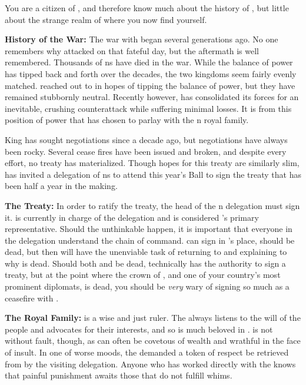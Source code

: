\documentclass[blue]{NeptuneBall}
\begin{document}
\name{\bPacifican{}}

You are a citizen of \pPacifica{}, and therefore know much about the history of \pPacifica{}, but little about the strange realm of \pAtlantis{} where you now find yourself.

{\bf History of the War:}
The war with \pAtlantis{} began several generations ago. No one remembers why \pAtlantis{} attacked on that fateful day, but the aftermath is well remembered. Thousands of \pPacifica{}ns have died in the war. While the balance of power has tipped back and forth over the decades, the two kingdoms seem fairly evenly matched. \pPacifica{} reached out to \pIndia{} in hopes of tipping the balance of power, but they have remained stubbornly neutral. Recently however, \pPacifica{} has consolidated its forces for an inevitable, crushing counterattack while suffering minimal losses. It is from this position of power that \cPacificanRuler{\King} \cPacificanRuler{} has chosen to parlay with the \pAtlantis{}n royal family.

King \cKing{\MYname{}} has sought negotiations since a decade ago, but negotiations have always been rocky. Several cease fires have been issued and broken, and despite every effort, no treaty has materialized. Though hopes for this treaty are similarly slim, \cKing{\King} \cKing{} has invited a delegation of \pPacifica{}ns to attend this year's \cExExKing{} Ball to sign the treaty that has been half a year in the making.

{\bf The Treaty:}
In order to ratify the treaty, the head of the \pPacifica{}n delegation must sign it. \cPrince{} is currently in charge of the delegation and is considered \pPacifica{}'s primary representative. Should the unthinkable happen, it is important that everyone in the delegation understand the chain of command. \cDiplomat{} can sign in \cPrince{}'s place, should \cPrince{} be dead, but then \cDiplomat{} will have the unenviable task of returning to \pPacifica{} and explaining to \cPacificanRuler{\King} \cPacificanRuler{} why \cPacificanRuler{\their} \cPrince{\offspring} is dead. Should both \cPrince{} and \cDiplomat{} be dead, technically \cSpy{} has the authority to sign a treaty, but at the point where the crown  of \pPacifica{}, and one of your country's most prominent diplomats, is dead, you should be \emph{very} wary of signing so much as a ceasefire with \pAtlantis{}.

{\bf The Royal Family:}
\cPacificanRuler{\King} \cPacificanRuler{} is a wise and just ruler. The \cPacificanRuler{\King} always listens to the will of the people and advocates for their interests, and so is much beloved in \pPacifica{}. \cPacificanRuler{\They} is not without fault, though, as \cPacificanRuler{\they} can often be covetous of wealth and wrathful in the face of insult. In one of \cPacificanRuler{\their} worse moods, the \cPacificanRuler{\King} demanded a token of respect be retrieved from \pAtlantis{} by the visiting delegation. Anyone who has worked directly with the \cPacificanRuler{\King} knows that painful punishment awaits those that do not fulfill \cPacificanRuler{\their} whims.
\end{document}
